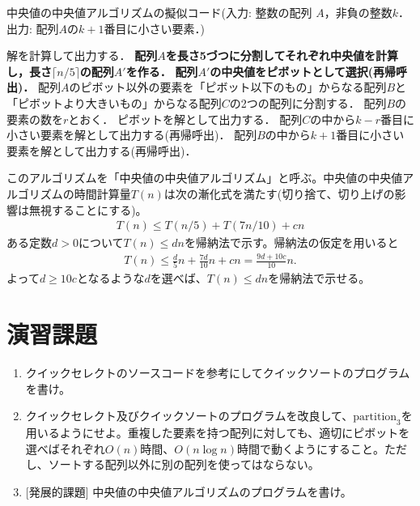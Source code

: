 \documentclass[a4paper,twoside,onecolumn,openany,article,10pt]{memoir}
\theoremstyle{remark}
\begin{document}
\begin{algorithm}
\caption{中央値の中央値アルゴリズムの擬似コード(入力: 整数の配列 $A$，非負の整数$k$．出力: 配列$A$の$k+1$番目に小さい要素．)}
\label{alg:qselectl}
\begin{algorithmic}
  \State 解を計算して出力する．
\Else
  \State \textbf{配列$A$を長さ5づつに分割してそれぞれ中央値を計算し，長さ$\lceil n/5\rceil$の配列$A'$を作る．}
  \State \textbf{配列$A'$の中央値をピボットとして選択(再帰呼出)．}
  \State 配列$A$のピボット以外の要素を「ピボット以下のもの」からなる配列$B$と「ピボットより大きいもの」からなる配列$C$の2つの配列に分割する．
  \State 配列$B$の要素の数を$r$とおく．
    \State ピボットを解として出力する．
    \State 配列$C$の中から$k-r$番目に小さい要素を解として出力する(再帰呼出)．
  \Else
    \State 配列$B$の中から$k+1$番目に小さい要素を解として出力する(再帰呼出)．
  \EndIf
\EndIf
\end{algorithmic}
\end{algorithm}

このアルゴリズムを「中央値の中央値アルゴリズム」と呼ぶ。中央値の中央値アルゴリズムの時間計算量$T(n)$は次の漸化式を満たす(切り捨て、切り上げの影響は無視することにする)。
\begin{align*}
T(n) \le T(n/5) + T(7n/10) + cn
\end{align*}
ある定数$d>0$について$T(n)\le dn$を帰納法で示す。帰納法の仮定を用いると
\begin{align*}
T(n) \le \frac{d}{5}n + \frac{7d}{10}n + cn = \frac{9d + 10 c}{10} n.
\end{align*}
よって$d\ge 10 c$となるような$d$を選べば、$T(n)\le d n$を帰納法で示せる。


\section{演習課題}
\begin{enumerate}
\item クイックセレクトのソースコードを参考にしてクイックソートのプログラムを書け。
\item クイックセレクト及びクイックソートのプログラムを改良して、$\mathrm{partition}_3$を用いるようにせよ。重複した要素を持つ配列に対しても、適切にピボットを選べばそれぞれ$O(n)$時間、$O(n\log n)$時間で動くようにすること。ただし、ソートする配列以外に別の配列を使ってはならない。
\item {[発展的課題]} 中央値の中央値アルゴリズムのプログラムを書け。
\end{enumerate}
\end{document}
